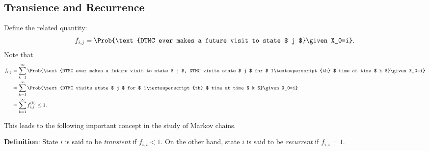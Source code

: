 \subsection*{Transience and Recurrence}
\begin{Regular}
    Define the related quantity:
    \[ f_{i,j}=\Prob{\text{DTMC ever makes a future visit to state $ j $}\given X_0=i}. \]
    Note that
    \begin{align*}
        f_{i,j}
         & =\sum_{k=1}^{\infty} \Prob{\text{DTMC ever makes a future visit to state $ j $, DTMC visits state $ j $ for $ 1\textsuperscript{th} $ time at time $ k $}\given X_0=i} \\
         & =\sum_{k=1}^{\infty} \Prob{\text{DTMC visits state $ j $ for $ 1\textsuperscript{th} $ time at time $ k $}\given X_0=i}                                                \\
         & =\sum_{k=1}^{\infty} f_{i,j}^{(k)}\le 1.
    \end{align*}
\end{Regular}
This leads to the following important concept in the study of Markov chains.
\begin{Regular}
    \textbf{Definition}: State $ i $ is said to be \emph{transient} if $ f_{i,i}<1 $. On the other hand, state $ i $ is said to be
    \emph{recurrent} if $ f_{i,i}=1 $.
\end{Regular}
